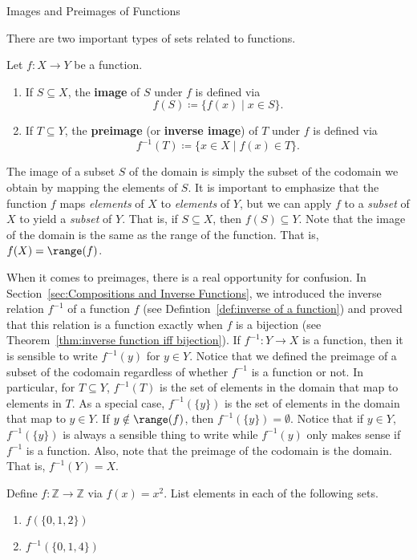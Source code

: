 \begin{section}{Images and Preimages of Functions}\label{sec:Images and Inverse Images}

There are two important types of sets related to functions.

\begin{definition}
Let $f:X\to Y$ be a function.  \begin{enumerate}[label=\textrm{(\alph*)}]
\item If $S\subseteq X$, the \textbf{image} of $S$ under $f$ is defined via
\[
\boxed{f(S)\coloneqq \{f(x) \mid  x\in S\}}.
\]
\item  If $T\subseteq Y$, the \textbf{preimage} (or \textbf{inverse image}) of $T$ under $f$ is defined via
\[
\boxed{f^{-1}(T)\coloneqq \{x\in X \mid  f(x)\in T\}}.
\]
\end{enumerate}
\end{definition}

The image of a subset $S$ of the domain is simply the subset of the codomain we obtain by mapping the elements of $S$. It is important to emphasize that the function $f$ maps \emph{elements} of $X$ to \emph{elements} of $Y$, but we can apply $f$ to a \emph{subset} of $X$ to yield a \emph{subset} of $Y$.  That is, if $S\subseteq X$, then $f(S)\subseteq Y$. Note that the image of the domain is the same as the range of the function.  That is, $f(X)=\range(f)$. 

When it comes to preimages, there is a real opportunity for confusion.  In Section~\ref{sec:Compositions and Inverse Functions}, we introduced the inverse relation $f^{-1}$ of a function $f$ (see Defintion~\ref{def:inverse of a function}) and proved that this relation is a function exactly when $f$ is a bijection (see Theorem~\ref{thm:inverse function iff bijection}). If $f^{-1}:Y\to X$ is a function, then it is sensible to write $f^{-1}(y)$ for $y\in Y$.  Notice that we defined the preimage of a subset of the codomain regardless of whether $f^{-1}$ is a function or not. In particular, for $T\subseteq Y$, $f^{-1}(T)$ is the set of elements in the domain that map to elements in $T$. As a special case, $f^{-1}(\{y\})$ is the set of elements in the domain that map to $y\in Y$.  If $y\notin \range(f)$, then $f^{-1}(\{y\})=\emptyset$. Notice that if $y\in Y$, $f^{-1}(\{y\})$ is always a sensible thing to write while $f^{-1}(y)$ only makes sense if $f^{-1}$ is a function. Also, note that the preimage of the codomain is the domain.  That is, $f^{-1}(Y)=X$.

\begin{problem}
Define $f:\mathbb{Z}\to\mathbb{Z}$ via $f(x)=x^2$. List elements in each of the following sets.
\begin{enumerate}[label=\textrm{(\alph*)}]
\item $f(\{0,1,2\})$
\item $f^{-1}(\{0,1,4\})$
\end{enumerate}
\end{problem}


\end{section}
